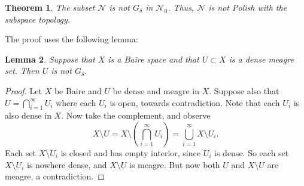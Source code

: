 \documentclass{amsart}
\newtheorem{theorem}{Theorem}[section]
\newtheorem{lemma}[theorem]{Lemma}
\theoremstyle{definition}
\theoremstyle{remark}
\begin{document}
\begin{theorem}
\label{thm : N not Polish}
    The subset $\mathcal{N}$ is not \(G_\delta\) in \(\mathcal{N}_0\). Thus, $\mathcal{N}$ is not Polish  with the subspace topology.
\end{theorem}

The proof uses the following lemma:

\begin{lemma}
\label{lem:not_g_delta}
    Suppose that $X$ is a Baire space and that $U \subset X$ is a dense meagre set.  Then $U$ is not $G_{\delta}$.
\end{lemma}
\begin{proof}
    Let \(X\) be Baire and \(U\) be dense and meagre in \(X\).
    Suppose also that $U = \bigcap_{i=1}^\infty U_i$ where each $U_i$ is open, towards contradiction. Note that each $U_i$ is also dense in $X$.  Now take the complement, and observe
\[ X \setminus U = X \setminus \left( \bigcap_{i=1}^\infty U_i \right)  = \bigcup_{i=1}^\infty X \setminus U_i.
\]
Each set $X \setminus U_i$ is closed and has empty interior, since $U_i$ is dense.  So each set \(X \setminus U_i\) is nowhere dense, and $X \setminus U$ is meagre. But now both $U$ and $X \setminus U$ are meagre, a contradiction.
\end{proof}
\end{document}
